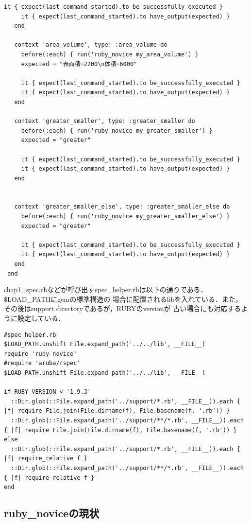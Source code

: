 \begin{lstlisting}[style=customRuby,basicstyle={\scriptsize\ttfamily}]
     it { expect(last_command_started).to be_successfully_executed }
     it { expect(last_command_started).to have_output(expected) }
   end
 
   context 'area_volume', type: :area_volume do
     before(:each) { run('ruby_novice my_area_volume') }
     expected = "表面積=2200\n体積=6000"
 
     it { expect(last_command_started).to be_successfully_executed }
     it { expect(last_command_started).to have_output(expected) }
   end
 
   context 'greater_smaller', type: :greater_smaller do
     before(:each) { run('ruby_novice my_greater_smaller') }
     expected = "greater"
 
     it { expect(last_command_started).to be_successfully_executed }
     it { expect(last_command_started).to have_output(expected) }
   end
 
 
   context 'greater_smaller_else', type: :greater_smaller_else do
     before(:each) { run('ruby_novice my_greater_smaller_else') }
     expected = "greater"
 
     it { expect(last_command_started).to be_successfully_executed }
     it { expect(last_command_started).to have_output(expected) }
   end
 end
\end{lstlisting}

chap1\_spec.rbなどが呼び出すspec\_helper.rbは以下の通りである．\$LOAD\_PATHにgemの標準構造の
場合に配置されるlibを入れている．また，その後はsupport directoryであるが，RUBYのversionが
古い場合にも対応するように設定している．

\begin{lstlisting}[style=customRuby,basicstyle={\scriptsize\ttfamily}]
#spec_helper.rb
$LOAD_PATH.unshift File.expand_path('../../lib', __FILE__)
require 'ruby_novice'
#require 'aruba/rspec'
$LOAD_PATH.unshift File.expand_path('../../lib', __FILE__)

if RUBY_VERSION < '1.9.3'
  ::Dir.glob(::File.expand_path('../support/*.rb', __FILE__)).each { |f| require File.join(File.dirname(f), File.basename(f, '.rb')) }
  ::Dir.glob(::File.expand_path('../support/**/*.rb', __FILE__)).each { |f| require File.join(File.dirname(f), File.basename(f, '.rb')) }
else
  ::Dir.glob(::File.expand_path('../support/*.rb', __FILE__)).each { |f| require_relative f }
  ::Dir.glob(::File.expand_path('../support/**/*.rb', __FILE__)).each { |f| require_relative f }
end
\end{lstlisting}
\subsection{ruby\_noviceの現状}

